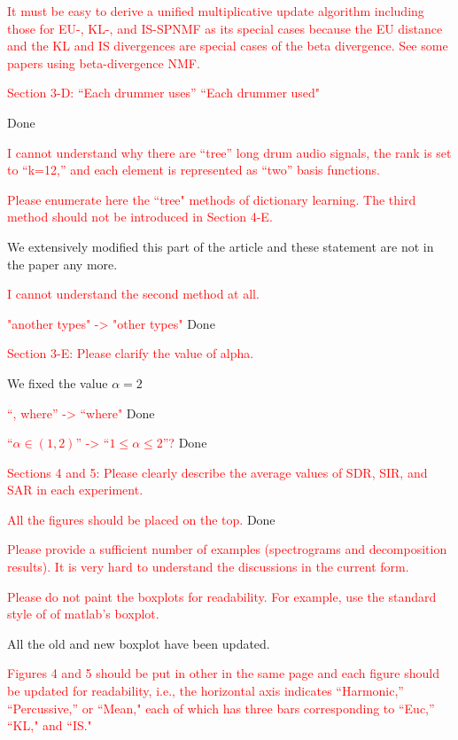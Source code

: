 \documentclass[]{article}
\begin{document}
\textcolor{red}{It must be easy to derive a unified multiplicative update algorithm including those for EU-, KL-, and IS-SPNMF as its special cases because the EU distance and the KL and IS divergences are special cases of the beta divergence. See some papers using beta-divergence NMF.
}




\textcolor{red}{Section 3-D:
“Each drummer uses”  “Each drummer used"}

Done

\textcolor{red}{I cannot understand why there are “tree” long drum audio signals, the rank is set to “k=12,” and each element is represented as “two” basis functions.
}

\textcolor{red}{Please enumerate here the “tree" methods of dictionary learning. The third method should not be introduced in Section 4-E.
}

We extensively modified this part of the article and these statement are not in the paper any more. 

\textcolor{red}{I cannot understand the second method at all.
}


\textcolor{red}{"another types" -> "other types"
}
Done

\textcolor{red}{Section 3-E:
Please clarify the value of alpha.}

We fixed the value $\alpha = 2$

\textcolor{red}{“, where” -> “where"
}
Done

\textcolor{red}{“$\alpha \in (1, 2)$” -> “$1 \le \alpha \le 2$”?}
Done

\textcolor{red}{Sections 4 and 5:
Please clearly describe the average values of SDR, SIR, and SAR in each experiment.
}

\textcolor{red}{All the figures should be placed on the top.
}
Done

\textcolor{red}{Please provide a sufficient number of examples (spectrograms and decomposition results). It is very hard to understand the discussions in the current form.
}

\textcolor{red}{Please do not paint the boxplots for readability. For example, use the standard style of of matlab’s boxplot.
}

All the old and new boxplot have been updated. 

\textcolor{red}{Figures 4 and 5 should be put in other in the same page and each figure should be updated for readability, i.e., the horizontal axis indicates “Harmonic,” “Percussive,” or “Mean," each of which has three bars corresponding to “Euc,” “KL," and “IS."
}
\end{document}
